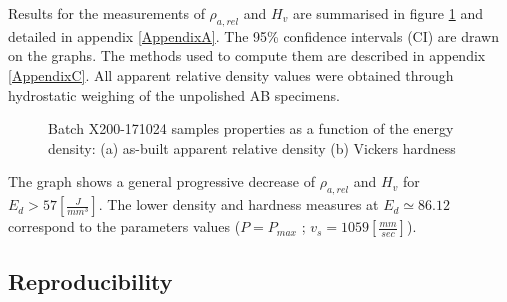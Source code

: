 Results for the measurements of $\rho_{a,rel}$ and $H_v$ are summarised in figure \ref{fig:HD2-171024} and detailed in appendix \ref{AppendixA}. The 95\% confidence intervals (CI) are drawn on the graphs. The methods used to compute them are described in appendix \ref{AppendixC}. All apparent relative density values were obtained through hydrostatic weighing of the unpolished AB specimens.\\

\begin{figure}[ht]
\centering
\noindent{}
\decoRule
\caption[Batch X200-171024 samples properties as a function of the energy density: (a) as-built apparent relative density (b) Vickers hardness]{Batch X200-171024 samples properties as a function of the energy density: (a) as-built apparent relative density (b) Vickers hardness}
\label{fig:HD2-171024}
\end{figure} 

 The graph shows a general progressive decrease of  $\rho_{a,rel}$ and $H_v$ for $E_d>57 [\frac{J}{mm^3}]$. The lower density and hardness measures at $E_d \simeq 86.12$ correspond to the parameters values ($P=P_{max}$ ; $v_s=1059 [\frac{mm}{sec}]$).


\subsection{Reproducibility}
\label{RReprod}
